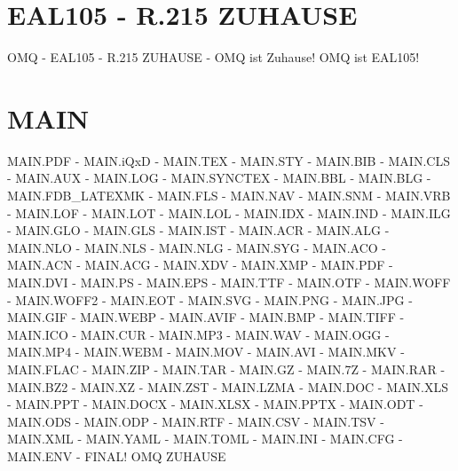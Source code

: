 \documentclass{MAIN}
\begin{document}
\maketitle
\section*{EAL105 - R.215 ZUHAUSE}
OMQ - EAL105 - R.215 ZUHAUSE - OMQ ist Zuhause! OMQ ist EAL105!
\section*{MAIN}
MAIN.PDF - MAIN.iQxD - MAIN.TEX - MAIN.STY - MAIN.BIB - MAIN.CLS - MAIN.AUX - MAIN.LOG - MAIN.SYNCTEX - MAIN.BBL - MAIN.BLG - MAIN.FDB_LATEXMK - MAIN.FLS - MAIN.NAV - MAIN.SNM - MAIN.VRB - MAIN.LOF - MAIN.LOT - MAIN.LOL - MAIN.IDX - MAIN.IND - MAIN.ILG - MAIN.GLO - MAIN.GLS - MAIN.IST - MAIN.ACR - MAIN.ALG - MAIN.NLO - MAIN.NLS - MAIN.NLG - MAIN.SYG - MAIN.ACO - MAIN.ACN - MAIN.ACG - MAIN.XDV - MAIN.XMP - MAIN.PDF - MAIN.DVI - MAIN.PS - MAIN.EPS - MAIN.TTF - MAIN.OTF - MAIN.WOFF - MAIN.WOFF2 - MAIN.EOT - MAIN.SVG - MAIN.PNG - MAIN.JPG - MAIN.GIF - MAIN.WEBP - MAIN.AVIF - MAIN.BMP - MAIN.TIFF - MAIN.ICO - MAIN.CUR - MAIN.MP3 - MAIN.WAV - MAIN.OGG - MAIN.MP4 - MAIN.WEBM - MAIN.MOV - MAIN.AVI - MAIN.MKV - MAIN.FLAC - MAIN.ZIP - MAIN.TAR - MAIN.GZ - MAIN.7Z - MAIN.RAR - MAIN.BZ2 - MAIN.XZ - MAIN.ZST - MAIN.LZMA - MAIN.DOC - MAIN.XLS - MAIN.PPT - MAIN.DOCX - MAIN.XLSX - MAIN.PPTX - MAIN.ODT - MAIN.ODS - MAIN.ODP - MAIN.RTF - MAIN.CSV - MAIN.TSV - MAIN.XML - MAIN.YAML - MAIN.TOML - MAIN.INI - MAIN.CFG - MAIN.ENV - FINAL!
\cite{omq_eal105}
\ac{OMQ}
\ac{ZUHAUSE}

\printindex
\printglossary
\printnomenclature
\printacronyms
\end{document}

